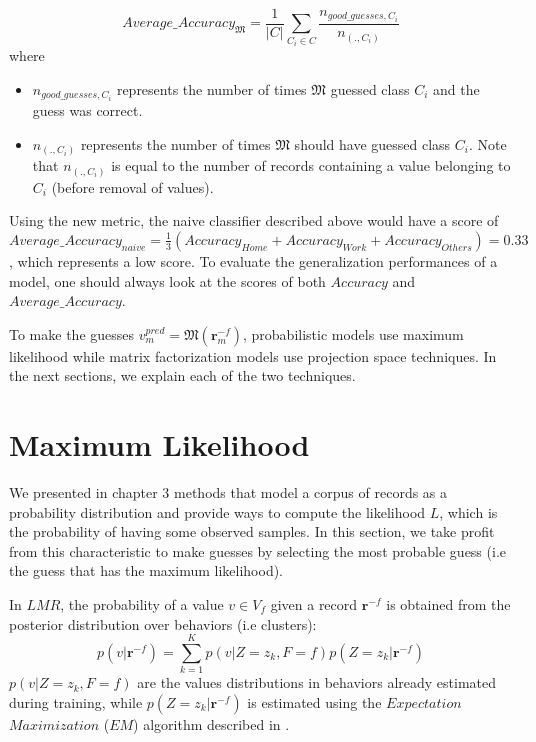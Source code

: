 \begin{equation}
Average\_Accuracy_{\mathfrak{M}}=\frac{1}{|C|}\sum_{C_{i}\in C}\frac{n_{good\_guesses,C_{i}}}{n_{(.,C_{i})}}
\end{equation}
where 
\begin{itemize} 
	\item $n_{good\_guesses,C_{i}}$  represents the number of times $\mathfrak{M}$ guessed class $C_{i}$ and the guess was correct.
	\item $n_{(.,C_{i})}$ represents the number of times $\mathfrak{M}$ should have guessed class $C_{i}$. Note that $n_{(.,C_{i})}$ is equal to the number of records containing a value belonging to $C_{i}$ (before removal of 				values).
\end{itemize}
Using the new metric, the naive classifier described above would have a score of $Average\_Accuracy_{naive}=\frac{1}{3}(Accuracy_{Home}+Accuracy_{Work}+Accuracy_{Others})=0.33$, which represents a low score. To evaluate the generalization performances of a model, one should always look at the scores of both $Accuracy$ and $Average\_Accuracy$.\par

To make the guesses $v_{m}^{pred}=\mathfrak{M}(\mathbf{r}_{m}^{-f})$, probabilistic models use maximum likelihood while matrix factorization models use projection space techniques. In the next sections, we explain each of the two techniques. 
\section{Maximum Likelihood}

We presented in chapter 3 methods that model a corpus of records as a probability distribution and provide ways to compute the likelihood $\mathit{L}$, which is the probability of having some observed samples. In this section, we take profit from this characteristic to make guesses by selecting the most probable guess (i.e the guess that has the maximum likelihood). \par

In $LMR$, the probability of a value $v \in V_{f}$ given a record $\mathbf{r}^{-f}$ is obtained from the posterior distribution over behaviors (i.e clusters):
\begin{equation}
p(v|\mathbf{r}^{-f})=\sum_{k=1}^{K}p(v|Z=z_{k}, F=f)p(Z=z_{k}|\mathbf{r}^{-f})
\end{equation}
$p(v|Z=z_{k}, F=f)$ are the values distributions in behaviors already estimated during training, while $p(Z=z_{k}|\mathbf{r}^{-f})$ is estimated using the $Expectation$ $Maximization$ ($EM$) algorithm described in \cite{plsi}. \par


